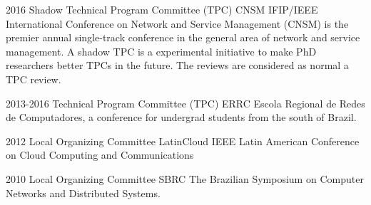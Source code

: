 \documentclass[print]{friggeri-cv} %
\begin{document}
\begin{entrylist}
\entry
{2016} 
{Shadow Technical Program Committee (TPC)}
{CNSM}
{IFIP/IEEE International Conference on Network and Service Management (CNSM) is the premier annual single-track conference in the general area of network and service management. A shadow TPC is a experimental initiative to make PhD researchers better TPCs in the future. The reviews are considered as normal a TPC review. }

\entry
{2013-2016} 
{Technical Program Committee (TPC)}
{ERRC}
{Escola Regional de Redes de Computadores, a conference for undergrad students from the south of Brazil.}

\entry
{2012} 
{Local Organizing Committee}
{LatinCloud}
{IEEE Latin American Conference on Cloud Computing and Communications}

\entry
{2010}
{Local Organizing Committee}
{SBRC}
{The Brazilian Symposium on Computer Networks and Distributed Systems.}

\end{entrylist}






\end{document}
